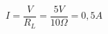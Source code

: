\documentclass[dvisvgm,tikz]{standalone}
\begin{document}
\Large
\[I=\frac{V}{R_{L}}=\frac{5V}{10\Omega}=0,5A\]
\end{document}
